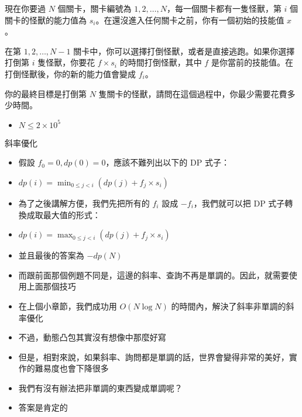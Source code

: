 \documentclass[standalone]{beamer}
\begin{document}
\begin{frame}{}
  \begin{problem}
    現在你要過 $N$ 個關卡，關卡編號為 $1, 2, \dots, N$，每一個關卡都有一隻怪獸，第 $i$ 個關卡的怪獸的能力值為 $s_i$。在還沒進入任何關卡之前，你有一個初始的技能值 $x$。

    在第 $1, 2, \dots, N - 1$ 關卡中，你可以選擇打倒怪獸，或者是直接逃跑。如果你選擇打倒第 $i$ 隻怪獸，你要花 $f \times s_i$ 的時間打倒怪獸，其中 $f$ 是你當前的技能值。在打倒怪獸後，你的新的能力值會變成 $f_i$。

    你的最終目標是打倒第 $N$ 隻關卡的怪獸，請問在這個過程中，你最少需要花費多少時間。

    \begin{itemize}
      \item $N \leq 2 \times 10^5$
    \end{itemize}
  \end{problem}
\end{frame}

\begin{frame}{斜率優化}
  \begin{itemize}
    \item 假設 $f_0 = 0, dp(0) = 0$，應該不難列出以下的 DP 式子：
    \item $dp(i) = \min_{0 \leq j < i}(dp(j) + f_j \times s_i)$
    \item 為了之後講解方便，我們先把所有的 $f_i$ 設成 $-f_i$，我們就可以把 DP 式子轉換成取最大值的形式：
    \item $dp(i) = \max_{0 \leq j < i}(dp(j) + f_j \times s_i)$
    \item 並且最後的答案為 $-dp(N)$
    \item 而跟前面那個例題不同是，這邊的斜率、查詢不再是單調的。因此，就需要使用上面那個技巧
  \end{itemize}
\end{frame}

\begin{frame}{}
  \begin{itemize}
    \item 在上個小章節，我們成功用 $O(N \log N)$ 的時間內，解決了斜率非單調的斜率優化
    \item 不過，動態凸包其實沒有想像中那麼好寫
    \item 但是，相對來說，如果斜率、詢問都是單調的話，世界會變得非常的美好，實作的難易度也會下降很多
    \item 我們有沒有辦法把非單調的東西變成單調呢？
    \item 答案是肯定的
  \end{itemize}
\end{frame}
\end{document}
